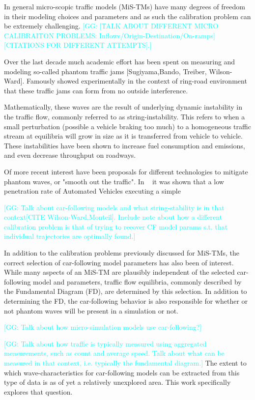 \documentclass[english,titlepage,oneside,12pt]{article}
\newcommand{\kibitz}[2]{\ifnum\Comments=0\textcolor{#1}{#2}\fi}
\newcommand{\George}[1]{\kibitz{cyan}      {[GG: #1]}}
\begin{document}
In general micro-scopic traffic models (MiS-TMs) have many degrees of freedom in their modeling choices and parameters and as such the calibration problem can be extremely challenging. \George{[TALK ABOUT DIFFERENT MICRO CALIBRAITON PROBLEMS: Inflows/Origin-Destination/On-ramps][CITATIONS FOR DIFFERENT ATTEMPTS].}  

Over the last decade much academic effort has been spent on measuring and modeling so-called phantom traffic jams [Sugiyama,Bando, Treiber, Wilson-Ward]. Famously \cite{Sugiyama} showed experimentally in the context of ring-road environment that these traffic jams can form from no outside interference.

Mathematically, these waves are the result of underlying dynamic instability in the traffic flow, commonly referred to as string-instability. This refers to when a small perturbation (possible a vehicle braking too much) to a homogeneous traffic stream at equilibria will grow in size as it is transferred from vehicle to vehicle. These instabilities have been shown to increase fuel consumption and emissions, and even decrease throughput on roadways.

Of more recent interest have been proposals for different technologies to mitigate phantom waves, or "smooth out the traffic". In ~\cite{Stern_RingRoad} it was shown that a low penetration rate of Automated Vehicles executing a simple 

\George{Talk about car-following models and what string-stability is in that context[CITE Wilson-Ward,Monteil]. Include note about how a different calibration problem is that of trying to recover CF model params s.t. that individual trajectories are optimally found.}

In addition to the calibration problems previously discussed for MiS-TMs, the correct selection of car-following model parameters has also been of interest. While many aspects of an MiS-TM are plausibly independent of the selected car-following model and parameters, traffic flow equilibria, commonly described by the Fundamental Diagram (FD), are determined by this selection. In addition to determining the FD, the car-following behavior is also responsible for whether or not phantom waves will be present in a simulation or not.

\George{Talk about how micro-simulation models use car-following?}

\George{Talk about how traffic is typically measured using aggregated measurements, such as count and average speed. Talk about what can be measured in that context, i.e. typically the fundamental diagram.} The extent to which wave-characteristics for car-following models can be extracted from this type of data is as of yet a relatively unexplored area. This work specifically explores that question.
\end{document}
